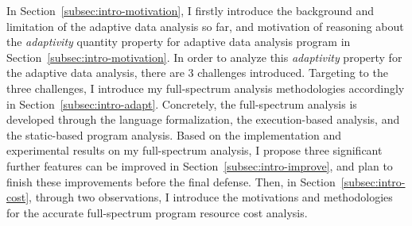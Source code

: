 In Section~\ref{subsec:intro-motivation},
I firstly introduce the background and limitation of the 
adaptive data analysis so far, 
and motivation of reasoning about the \emph{adaptivity} quantity property 
for adaptive data analysis program in Section~\ref{subsec:intro-motivation}.
In order to analyze this \emph{adaptivity} property for the adaptive data analysis, there are 3 challenges
introduced.
Targeting to the three challenges, I introduce my full-spectrum analysis methodologies accordingly in Section~\ref{subsec:intro-adapt}.
Concretely, the full-spectrum analysis is developed through the language formalization,
the execution-based analysis, and the static-based program analysis.
%
Based on the implementation and experimental results on my full-spectrum analysis, 
I propose three significant 
further features can be improved 
in Section~\ref{subsec:intro-improve}, 
and plan to finish these improvements 
before the final defense.
%
 Then, in Section~\ref{subsec:intro-cost}, through two observations, I introduce the motivations and methodologies
 for the accurate full-spectrum program resource cost analysis.
